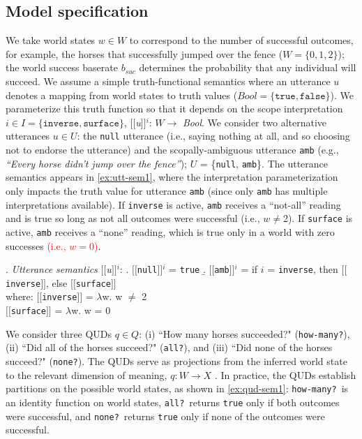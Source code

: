 \documentclass[preprint,authoryear]{elsarticle}\frenchspacing
\newcommand{\sem}[1]{\mbox{$[\![$#1$]\!]$}}
\newcommand{\lp}[1]{\textcolor{red}{#1}} %
\begin{document}
\subsection{Model specification}

We take world states $w\in W$ to correspond to the number of successful outcomes, for example, the horses that successfully jumped over the fence ($W=\{0,1,2\}$); the world success baserate $b_{suc}$ determines the probability that any individual will succeed. We assume a simple truth-functional semantics where an utterance $u$ denotes a mapping from world states to truth values ($Bool = \{\texttt{true},\texttt{false}\}$). We parameterize this truth function so that it depends on the scope interpretation $i \in I = \{\texttt{inverse}, \texttt{surface}\}$, \sem{\textit{u}}$^{i}$: $W\rightarrow$ \emph{Bool}. We consider two alternative utterances $u \in U$: the \texttt{null} utterance (i.e., saying nothing at all, and so choosing not to endorse the utterance) and the scopally-ambiguous utterance \texttt{amb} (e.g., \textit{``Every horse didn't jump over the fence''}); $U$ = \{\texttt{null}, \texttt{amb}\}. The utterance semantics appears in \ref{ex:utt-sem1}, where the interpretation parameterization only impacts the truth value for utterance \texttt{amb} (since only \texttt{amb} has multiple interpretations available). If \texttt{inverse} is active, \texttt{amb} receives a ``not-all'' reading and is true so long as not all outcomes were successful (i.e., $w\neq$2). If  \texttt{surface} is active, \texttt{amb} receives a ``none'' reading, which is true only in a world with zero successes \lp{(i.e., $w=0$)}.

\ex. \label{ex:utt-sem1} \emph{Utterance semantics} \sem{\textit{u}}$^{i}$:
\a. \sem{\texttt{null}}$^{i}$ = \texttt{true}
\b. \sem{\texttt{amb}}$^{i}$ = if $i$ = \texttt{inverse}, then  \sem{\texttt{inverse}}, else \sem{\texttt{surface}}\\[5pt]
 where: \sem{\texttt{inverse}} = $\lambda$w. w $\neq$ 2 \\
\phantom{where:} \sem{\texttt{surface}} = $\lambda$w. w = 0


We consider three QUDs $q \in Q$: 
(i) ``How many horses succeeded?" (\texttt{how-many?}), 
(ii) ``Did all of the horses succeed?" (\texttt{all?}), and 
(iii) ``Did none of the horses succeed?" (\texttt{none?}). 
The QUDs serve as projections from the inferred world state to the relevant dimension of meaning, $q: W \rightarrow X$ \citep*{kaoetal2014,kaoetal2014metaphor}. In practice, the QUDs establish partitions on the possible world states, as shown in \ref{ex:qud-sem1}: \texttt{how-many?}~is an identity function on world states, \texttt{all?}~returns \texttt{true} only if  both outcomes were successful, and \texttt{none?}~returns \texttt{true} only if none of the outcomes were successful.
\end{document}

